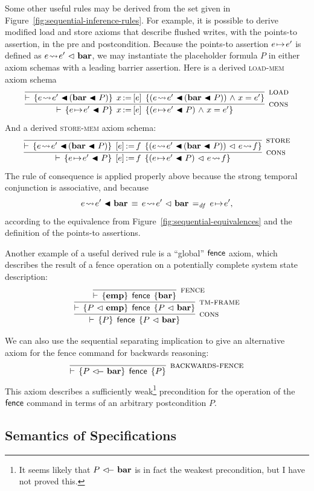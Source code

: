 \documentclass[11pt]{report}
\begin{document}
Some other useful rules may be derived from the set given in Figure~\ref{fig:sequential-inference-rules}. For example, it is possible to derive modified load and store axioms that describe flushed writes, with the points-to assertion, in the pre and postcondition. Because the points-to assertion $e \!\mapsto\! e'$ is defined as $e \!\leadsto\! e' \operatorname{\,\vartriangleleft\,} \mathbf{bar}$, we may instantiate the placeholder formula $P$ in either axiom schemas with a leading barrier assertion. Here is a derived \textsc{load-mem} axiom schema \[ \infer[\textsc{cons}]{\triple{e \fpointsto e' \fsseq P}{\cload{x}{e}}{(e \fpointsto e' \fsseq P) \conj x = e'}}{\infer[\textsc{load}]{\triple{e \fwriteu e' \fsseq (\fbaru \fsseq P)}{\cload{x}{e}}{(e \fwriteu e' \fsseq (\fbaru \fsseq P)) \conj x = e'}}{}}\] And a derived \textsc{store-mem} axiom schema: \[ \infer[\textsc{cons}]{\triple{e \fpointsto e' \fsseq P}{\cstore{e}{f}}{(e \fpointsto e' \fsseq P) \fseq e \fwriteu f}}{\infer[\textsc{store}]{\triple{e \fwriteu e' \fsseq (\fbaru \fsseq P)}{\cstore{e}{f}}{(e \fwriteu e' \fsseq (\fbaru \fsseq P)) \fseq e \fwriteu f}}{}}\]The rule of consequence is applied properly above because the strong temporal conjunction is associative, and because \[e \!\leadsto\! e' \operatorname{\,\blacktriangleleft\,} \mathbf{bar} \,\equiv\, e \!\leadsto\! e' \operatorname{\,\vartriangleleft\,} \mathbf{bar} \operatorname{\;=_{\mathit{df}}\;} e \!\mapsto\! e',\] according to the equivalence from Figure~\ref{fig:sequential-equivalences} and the definition of the points-to assertions. 

Another example of a useful derived rule is a ``global'' $\operatorname{\mathsf{fence}}$ axiom, which describes the result of a fence operation on a potentially complete system state description: \[ \infer[\textsc{cons}]{ \triple{P}{\cfence}{P \fseq \fbaru} }{ \infer[\textsc{tm-frame}]{\triple{P \fseq \femp}{\cfence}{P \fseq \fbaru}}{ \infer[\textsc{fence}]{\triple{\femp}{\cfence}{\fbaru}}{} } }\] 

We can also use the sequential separating implication to give an alternative axiom for the fence command for backwards reasoning: \[ \infer[\textsc{backwards-fence}]{\triple{P \fseqri \fbaru}{\cfence}{P}}{} \] This axiom describes a sufficiently weak\footnote{It seems likely that $P \fseqri \fbaru$ is in fact the weakest precondition, but I have not proved this.} precondition for the operation of the $\operatorname{\mathsf{fence}}$ command in terms of an arbitrary postcondition $P$.

\subsection{Semantics of Specifications}
\end{document}
